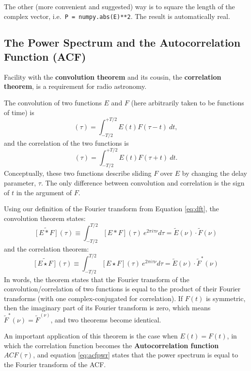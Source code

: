 \documentclass[11pt,preprint]{aastex}
\begin{document}
The other (more convenient and suggested) way is to square the length of
the complex vector, i.e.\ \verb$P = numpy.abs(E)**2$. The result is
automatically real.


\subsection{The Power Spectrum and the Autocorrelation Function
  (ACF)} \label{acf}

\noindent
Facility with the {\bf convolution theorem} and its cousin,
the {\bf correlation theorem}, 
is a requirement for radio astronomy. 

The convolution of two functions $E$ and $F$ (here arbitrarily taken
to be functions of time) is
%
\begin{equation}
[E * F](\tau) = \int_{-T/2}^{+T/2} E(t) F(\tau - t) \ dt,
\end{equation}
%
and the correlation of the two functions is
%
\begin{equation}
[E\star F](\tau) = \int_{-T/2}^{+T/2} E(t) F(\tau + t) \ dt.
\end{equation}
%
\noindent Conceptually, these two functions describe sliding $F$ over
$E$ by changing the delay parameter, $\tau$.
The only difference between convolution and correlation is the sign of $t$ in the argument of
$F$.

Using our definition of the Fourier transform from
Equation \ref{eq:dft}, the convolution theorem states:
%
\begin{equation}
\widetilde{[E*F]}(\tau)\equiv\int_{-T/2}^{T/2} [E*F](\tau)~e^{2\pi i \tau\nu} d\tau =
    \tilde E(\nu) \cdot \tilde F(\nu)
\end{equation}
%
and the correlation theorem:
\begin{equation}
\widetilde{[E\star F]}(\tau)\equiv\int_{-T/2}^{T/2} [E\star F](\tau)~e^{2\pi i \tau\nu} d\tau =
    \tilde E(\nu) \cdot \tilde F^*(\nu)
\label{eq:acfpwr}
\end{equation}
%
In words, the theorem states that the Fourier transform of
  the convolution/correlation of two functions is equal to the product of their
  Fourier transforms (with one complex-conjugated for correlation).
If $F(t)$ is
symmetric, then the imaginary part of its Fourier transform is zero,
which means $\tilde F^*(\nu) = \tilde F^(\nu)$, and two theorems become
identical.

An important application of this theorem is the case when
$E(t)=F(t)$, in which the correlation function becomes the {\bf
  Autocorrelation function} $ACF(\tau)$, and equation \ref{eq:acfpwr}
states that the power spectrum is equal to the Fourier
  transform of the ACF.
\end{document}
